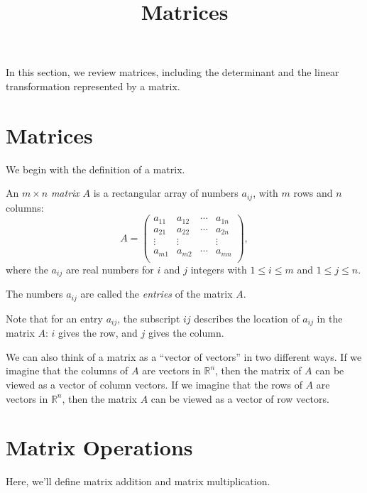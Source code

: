 \documentclass{ximera}
\title{Matrices}
\begin{document}
  
\begin{abstract}  
\end{abstract}  
\maketitle 

In this section, we review matrices, including the determinant and the linear transformation represented by a matrix.

\section{Matrices}

We begin with the definition of a matrix.

\begin{definition}
An $m\times n$ \emph{matrix} $A$ is a rectangular array of numbers $a_{ij}$, with $m$ rows and $n$ columns:
\[
A = \left(\begin{array}{cccc}
a_{11}& a_{12} & \cdots & a_{1n}\\
a_{21}& a_{22} & \cdots & a_{2n}\\
\vdots & \vdots & & \vdots\\
a_{m1}& a_{m2} & \cdots & a_{mn}\\
\end{array}\right), 
\]
where the $a_{ij}$ are real numbers for $i$ and $j$ integers with $1\leq i \leq m$ and $1\leq j\leq n$.

The numbers $a_{ij}$ are called the \emph{entries} of the matrix $A$.
\end{definition}

Note that for an entry $a_{ij}$, the subscript $ij$ describes the location of $a_{ij}$ in the matrix $A$: $i$ gives the row, and $j$ gives the column.

We can also think of a matrix as a ``vector of vectors'' in two different ways. If we imagine that the columns of $A$ are vectors in $\mathbb{R}^n$, then the matrix of $A$ can be viewed as a vector of column vectors. If we imagine that the rows of $A$ are vectors in $\mathbb{R}^n$, then the matrix $A$ can be viewed as a vector of row vectors.

\section{Matrix Operations}

Here, we'll define matrix addition and matrix multiplication.
\end{document}

